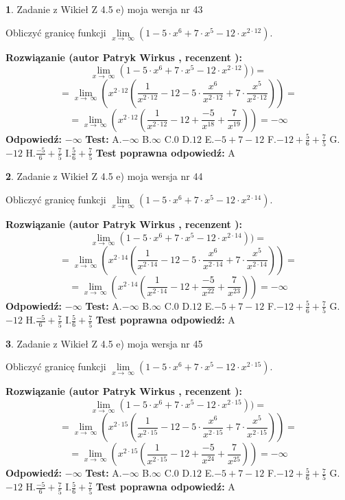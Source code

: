 \documentclass[12pt, a4paper]{article}
\theoremstyle{definition} %
\newtheorem{zad}{}
\newcommand{\zadStart}[1]{\begin{zad}#1\newline}
\newcommand{\zadStop}{\end{zad}}
\newcommand{\rozwStart}[2]{\noindent \textbf{Rozwiązanie (autor #1 , recenzent #2): }\newline}
\newcommand{\rozwStop}{\newline}
\newcommand{\odpStart}{\noindent \textbf{Odpowiedź:}\newline}
\newcommand{\odpStop}{\newline}
\newcommand{\testStart}{\noindent \textbf{Test:}\newline}
\newcommand{\testStop}{\newline}
\newcommand{\kluczStart}{\noindent \textbf{Test poprawna odpowiedź:}\newline}
\newcommand{\kluczStop}{\newline}
\begin{document}
\zadStart{Zadanie z Wikieł Z 4.5 e) moja wersja nr 43}



Obliczyć granicę funkcji  $\lim\limits_{x\to\ \infty}(1 - 5 \cdot x^{6}+7 \cdot x^{5}- 12 \cdot x^{2\cdot12})$.
\zadStop
\rozwStart{Patryk Wirkus}{}
$$\lim\limits_{x\to\ \infty}(1 - 5 \cdot x^{6}+7 \cdot x^{5}- 12 \cdot x^{2\cdot12}))=$$
$$=\lim\limits_{x\to\ \infty}(x^{2\cdot12}(\frac{1}{x^{2\cdot12}}-12 -5 \cdot \frac{x^{6}}{x^{2\cdot12}}+7 \cdot \frac{x^{5}}{x^{2\cdot12}}))=$$
$$=\lim\limits_{x\to\ \infty}(x^{2\cdot12}(\frac{1}{x^{2\cdot12}}-12 + \frac{-5}{x^{18}}+ \frac{7}{x^{19}}))=-\infty$$
\rozwStop
\odpStart
$-\infty$
\odpStop
\testStart
A.$-\infty$ B.$\infty$ C.$0$ D.$12$ E.$-5 + 7 - 12$
F.$-12+\frac{5}{6}+\frac{7}{5}$ G.$-12$
H.$\frac{-5}{6}+\frac{7}{5}$
I.$\frac{5}{6}+\frac{7}{5}$
\testStop
\kluczStart
A
\kluczStop



\zadStart{Zadanie z Wikieł Z 4.5 e) moja wersja nr 44}



Obliczyć granicę funkcji  $\lim\limits_{x\to\ \infty}(1 - 5 \cdot x^{6}+7 \cdot x^{5}- 12 \cdot x^{2\cdot14})$.
\zadStop
\rozwStart{Patryk Wirkus}{}
$$\lim\limits_{x\to\ \infty}(1 - 5 \cdot x^{6}+7 \cdot x^{5}- 12 \cdot x^{2\cdot14}))=$$
$$=\lim\limits_{x\to\ \infty}(x^{2\cdot14}(\frac{1}{x^{2\cdot14}}-12 -5 \cdot \frac{x^{6}}{x^{2\cdot14}}+7 \cdot \frac{x^{5}}{x^{2\cdot14}}))=$$
$$=\lim\limits_{x\to\ \infty}(x^{2\cdot14}(\frac{1}{x^{2\cdot14}}-12 + \frac{-5}{x^{22}}+ \frac{7}{x^{23}}))=-\infty$$
\rozwStop
\odpStart
$-\infty$
\odpStop
\testStart
A.$-\infty$ B.$\infty$ C.$0$ D.$12$ E.$-5 + 7 - 12$
F.$-12+\frac{5}{6}+\frac{7}{5}$ G.$-12$
H.$\frac{-5}{6}+\frac{7}{5}$
I.$\frac{5}{6}+\frac{7}{5}$
\testStop
\kluczStart
A
\kluczStop



\zadStart{Zadanie z Wikieł Z 4.5 e) moja wersja nr 45}



Obliczyć granicę funkcji  $\lim\limits_{x\to\ \infty}(1 - 5 \cdot x^{6}+7 \cdot x^{5}- 12 \cdot x^{2\cdot15})$.
\zadStop
\rozwStart{Patryk Wirkus}{}
$$\lim\limits_{x\to\ \infty}(1 - 5 \cdot x^{6}+7 \cdot x^{5}- 12 \cdot x^{2\cdot15}))=$$
$$=\lim\limits_{x\to\ \infty}(x^{2\cdot15}(\frac{1}{x^{2\cdot15}}-12 -5 \cdot \frac{x^{6}}{x^{2\cdot15}}+7 \cdot \frac{x^{5}}{x^{2\cdot15}}))=$$
$$=\lim\limits_{x\to\ \infty}(x^{2\cdot15}(\frac{1}{x^{2\cdot15}}-12 + \frac{-5}{x^{24}}+ \frac{7}{x^{25}}))=-\infty$$
\rozwStop
\odpStart
$-\infty$
\odpStop
\testStart
A.$-\infty$ B.$\infty$ C.$0$ D.$12$ E.$-5 + 7 - 12$
F.$-12+\frac{5}{6}+\frac{7}{5}$ G.$-12$
H.$\frac{-5}{6}+\frac{7}{5}$
I.$\frac{5}{6}+\frac{7}{5}$
\testStop
\kluczStart
A
\kluczStop
\end{document}
